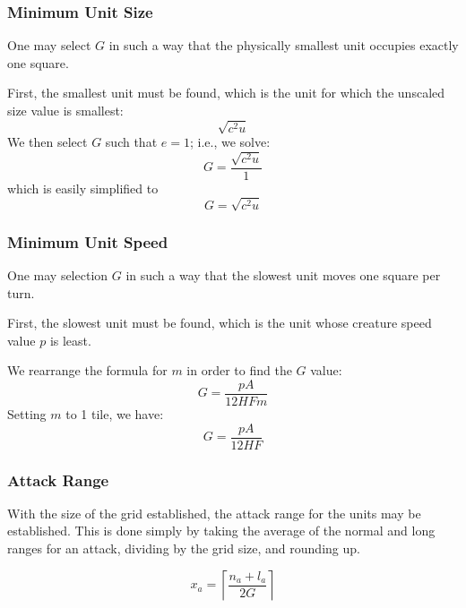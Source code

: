 \subsubsection{Minimum Unit Size}

One may select $G$ in such a way that the physically smallest unit
occupies exactly one square.

First, the smallest unit must be found,
which is the unit for which the unscaled size value is smallest:
\[
    \sqrt{c^2 u}
\]
We then select $G$ such that $e = 1$;
i.e., we solve:
\[
    G = \frac
            {\sqrt{c^2 u}}
            {1}
\]
which is easily simplified to
\[
    G = \sqrt{c^2 u}
\]

\subsubsection{Minimum Unit Speed}

One may selection $G$ in such a way that the slowest unit moves one square per turn.

First, the slowest unit must be found,
which is the unit whose creature speed value $p$ is least.

We rearrange the formula for $m$ in order to find the $G$ value:
\[
    G = \frac
            {p A}
            {12 H F m}
\]
Setting $m$ to 1 tile, we have:
\[
    G = \frac
            {p A}
            {12 H F}
\]

\subsubsection{Attack Range}

With the size of the grid established, the attack range for the units may be established.
This is done simply by taking the average of the normal and long ranges for an attack,
dividing by the grid size,
and rounding up.

\[
    x_a = \left\lceil\frac
        {n_a + l_a}
        {2 G}
        \right\rceil
\]

